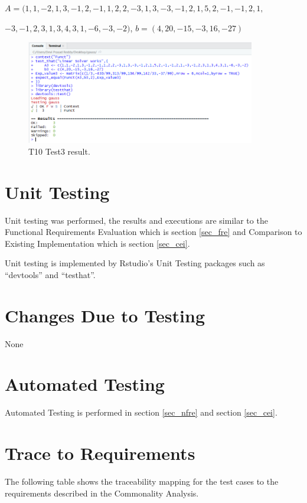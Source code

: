 \documentclass[12pt, titlepage]{article}
\begin{document}
$A = (1, 1, -2, 1, 3, -1, 2, -1, 1, 2, 2, -3, 1, 3, -3, -1, 2, 1, 5, 2, -1, -1, 2, 1,$

$-3, -1, 2, 3, 1, 3, 4, 3, 1, -6, -3, -2)$, $b = (4, 20, -15, -3, 16, -27)$

\begin{figure}[H]
\centering
 \includegraphics[width=100mm]{UT3}
  \caption{T10 Test3 result.}
  \label{fig:T11}
\end{figure}

\section{Unit Testing}

Unit testing was performed, the results and executions are similar to the Functional Requirements Evaluation which is section \ref{sec_fre} and Comparison to Existing Implementation which is section \ref{sec_cei}.

Unit testing is implemented by Rstudio's Unit Testing packages such as \enquote{devtools} and \enquote{testhat}.

\section{Changes Due to Testing}

None

\section{Automated Testing}

Automated Testing is performed in section \ref{sec_nfre} and section \ref{sec_cei}.
		
\section{Trace to Requirements}\label{sec_tracereq}

The following table shows the traceability mapping for the test cases to the requirements 
described in the Commonality Analysis.
\end{document}
